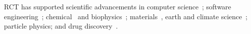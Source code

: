 \documentclass[preprint,12pt, a4paper]{elsarticle}
\begin{document}

RCT has supported scientific advancements in computer
science~\cite{merzky2018synapse}; software
engineering~\cite{turilli2019middleware}; chemical~\cite{sampat2018parallel} and
biophysics~\cite{shkurti2016coco,dakka2018high}; materials~\cite{dakka2018high},
earth and climate
science~\cite{paraskevakos2019workflow,balasubramanian2018harnessing}; particle
physics\cite{oleynik2017high}; and drug discovery~\cite{bfe-jctc-2014}.




\end{document}
